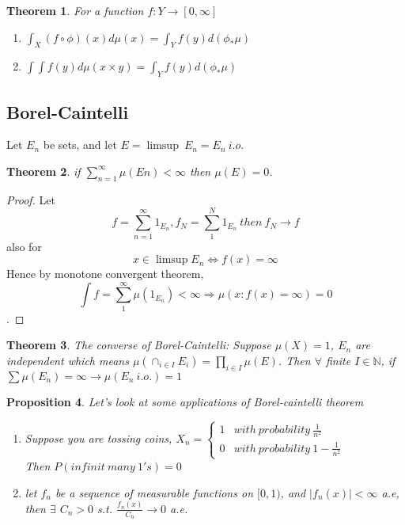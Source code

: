 \documentclass{article}
\newtheorem{theorem}{Theorem}[section]
\newtheorem{proposition}[theorem]{Proposition}
\theoremstyle{definition}
\begin{document}
\begin{theorem}
	For a function $f:Y\rightarrow [0,\infty]$
	\begin{enumerate}
		\item $\int_{X} (f\circ \phi)(x) d\mu(x) = \int_{Y} f(y) d(\phi_{*}\mu)$
		\item $\int\int f(y) d\mu(x\times y) = \int_{Y} f(y) d(\phi_{*}\mu)$
	\end{enumerate}
\end{theorem}

\subsection{Borel-Caintelli}

Let $E_{n}$ be sets, and let $E=\limsup \ E_n = E_{n} \ i.o.$

\begin{theorem}
	if $\sum_{n=1}^{\infty} \mu(En) < \infty$ then $\mu(E)=0$.
\end{theorem}

\begin{proof}
	Let $$f=\sum_{n=1}^{\infty}1_{E_n}, f_N=\sum_{1}^{N}1_{E_n} \ then \ f_N\rightarrow f$$
	also for $$x\in \limsup{E_n} \Leftrightarrow f(x)=\infty$$
 Hence by monotone convergent theorem, 
	$$\int f = \sum_{1}^{\infty} \mu(1_{E_n})<\infty \Rightarrow \mu(x:f(x)=\infty)=0$$.
\end{proof}

\begin{theorem}
	The converse of Borel-Caintelli: Suppose $\mu(X)=1$, $E_n$ are independent which means
	 $\mu(\cap_{i\in I} E_i)=\prod_{i\in I} \mu(E)$. Then $\forall$ finite $I\in \mathbb{N}$, if $\sum \mu(E_n)=\infty \rightarrow \mu(E_n \ i.o.)=1$
\end{theorem}
\begin{proposition}
	Let's look at some applications of Borel-caintelli theorem
	\begin{enumerate}
		\item Suppose you are tossing coins, $X_n=\left\{\begin{array}{cc}
		 1 & with \ probability \ \frac{1}{n^2} \\
		 0 & with \ probability \ 1-\frac{1}{n^2}
 		\end{array}\right.$\\
 		Then $P(infinit \ many \ 1's)=0$  
 		
 		\item let $f_n$ be a sequence of measurable functions on $[0,1)$, and $|f_n(x)|<\infty$ a.e, then $\exists$ $C_n>0$ s.t. $\frac{f_n(x)}{C_n} \rightarrow 0$ a.e.
	\end{enumerate}
\end{proposition}
\end{document}
